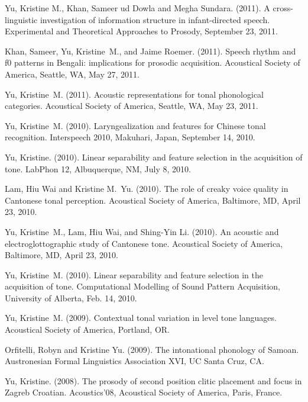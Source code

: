 \documentclass[10pt]{article}
\begin{document}
\begin{bibenum}

\item Yu, Kristine M., Khan, Sameer ud Dowla and Megha Sundara. (2011). A cross-linguistic
investigation of information structure in infant-directed
speech. Experimental and Theoretical Approaches to Prosody, September 23, 2011.

\item Khan, Sameer, Yu, Kristine~M., and Jaime Roemer. (2011). Speech rhythm and f0 patterns
in Bengali: implications for prosodic acquisition. Acoustical
Society of America, Seattle, WA, May 27, 2011.

\item Yu, Kristine~M. (2011). Acoustic representations for tonal phonological
categories. Acoustical Society of America, Seattle, WA, May
23, 2011.

\item Yu, Kristine~M. (2010). Laryngealization and features for Chinese tonal
recognition. Interspeech 2010, Makuhari, Japan, September 14, 2010.

\item Yu, Kristine. (2010). Linear separability and feature selection in the
acquisition of tone. LabPhon 12, Albuquerque, NM, July 8, 2010.

\item Lam, Hiu Wai and Kristine M.~Yu. (2010). The role of creaky voice quality in {C}antonese
tonal perception. Acoustical Society of America, Baltimore,
MD, April 23, 2010.

\item Yu, Kristine~M., Lam, Hiu Wai, and Shing-Yin Li. (2010). An acoustic and
electroglottographic study of {C}antonese tone. Acoustical
Society of America, Baltimore, MD, April 23, 2010.

\item Yu, Kristine~M. (2010). Linear separability and feature selection in the
acquisition of tone. Computational Modelling of Sound Pattern
Acquisition, University of Alberta, Feb. 14, 2010.

\item Yu, Kristine~M. (2009). Contextual tonal variation in level tone
languages. Acoustical Society of America, Portland, OR.

\item Orfitelli, Robyn and Kristine Yu. (2009). The intonational phonology of Samoan. Austronesian Formal Linguistics Association XVI, UC Santa Cruz, CA.

\item Yu, Kristine. (2008). The prosody of second position clitic placement and focus in Zagreb Croatian. Acoustics'08, Acoustical Society of America, Paris, France. 

\end{bibenum}
\end{document}

